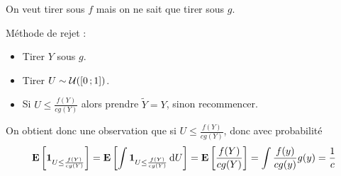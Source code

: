 \documentclass[a4paper,9pt]{article}
\begin{document}
		On veut tirer sous $f$ mais on ne sait que tirer sous $g$.
		
		
		Méthode de rejet :
		\begin{itemize}
			\item[\textbullet] Tirer $Y$ sous $g$.
			\item[\textbullet] Tirer $U \sim \mathcal{U}(\mathopen{}\mathclose{\left[0\mathclose{}\mathpunct{};1\right]})$.
			\item[\textbullet] Si $U \leq \frac{f(Y)}{cg(Y)}$ alors prendre $\tilde{Y} = Y$, sinon recommencer.
		\end{itemize}

		On obtient donc une observation que si $U \leq \frac{f(Y)}{cg(Y)}$, donc avec probabilité
		$$\mathbf{E} \left[ \operatorname{\mathbf{1}}_{U \leq \frac{f(Y)}{cg(Y)}} \right]
			= \mathbf{E} \left[ \int \operatorname{\mathbf{1}}_{U \leq \frac{f(Y)}{cg(Y)}} \mathop{}\mathopen{}\mathrm{d} U \right]
			= \mathbf{E} \left[ \frac{f(Y)}{cg(Y)} \right]
			= \int \frac{f(y)}{cg(y)} g(y) = \frac{1}{c}$$
\end{document}
